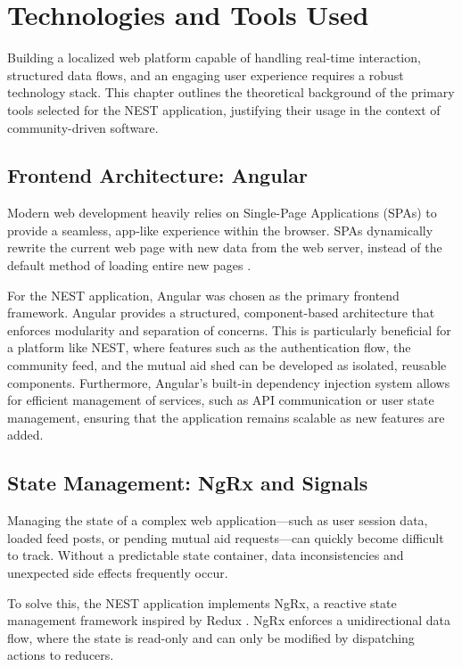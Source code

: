 \chapter{Technologies and Tools Used}
\label{chap:technologies-tools-used}

Building a localized web platform capable of handling real-time interaction, structured data flows, and an engaging user experience requires a robust technology stack. This chapter outlines the theoretical background of the primary tools selected for the NEST application, justifying their usage in the context of community-driven software.

\section{Frontend Architecture: Angular}
Modern web development heavily relies on Single-Page Applications (SPAs) to provide a seamless, app-like experience within the browser. SPAs dynamically rewrite the current web page with new data from the web server, instead of the default method of loading entire new pages \cite{angularDocs}. 

For the NEST application, Angular was chosen as the primary frontend framework. Angular provides a structured, component-based architecture that enforces modularity and separation of concerns. This is particularly beneficial for a platform like NEST, where features such as the authentication flow, the community feed, and the mutual aid shed can be developed as isolated, reusable components. Furthermore, Angular's built-in dependency injection system allows for efficient management of services, such as API communication or user state management, ensuring that the application remains scalable as new features are added.

\section{State Management: NgRx and Signals}
Managing the state of a complex web application—such as user session data, loaded feed posts, or pending mutual aid requests—can quickly become difficult to track. Without a predictable state container, data inconsistencies and unexpected side effects frequently occur.

To solve this, the NEST application implements NgRx, a reactive state management framework inspired by Redux \cite{ngrxDocs}. NgRx enforces a unidirectional data flow, where the state is read-only and can only be modified by dispatching actions to reducers. 

